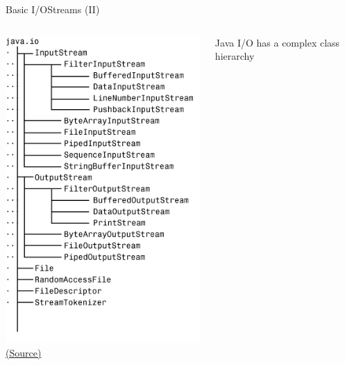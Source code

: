 \documentclass[10pt,compress]{beamer} %
\begin{document}
\begin{frame}[plain]{Basic I/O}{Streams (II)}
    \begin{columns}
		\vspace{-0.2cm}
		\includegraphics[width=0.9\linewidth]{figs/f13-1.png}\\
		\centering \tiny \href{http://www.webbasedprogramming.com/JAVA-Developers-Guide}{(Source)}

	   	Java I/O has a complex class hierarchy
		\\
		\bigskip
	\end{columns}
\end{frame}
\end{document}
